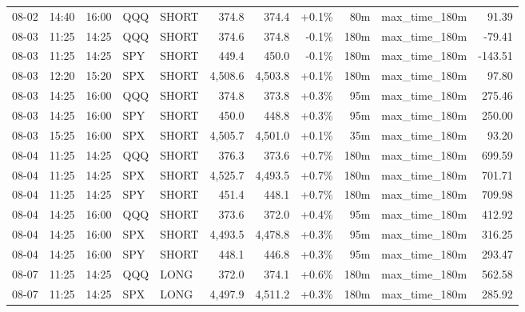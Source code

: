 \documentclass[11pt,a4paper,twoside]{article}
\begin{document}
\begin{center}
\begin{longtable}{>{\color{txtmain}}l l l l l r r r r >{\color{txtmain}}l r}
08-02 & 14:40 & 16:00 & QQQ & SHORT & 374.8 & 374.4 & \textcolor{wingreen}{+0.1\%} & 80m & max\_time\_180m & \textcolor{wingreen}{91.39} \\
08-03 & 11:25 & 14:25 & QQQ & SHORT & 374.6 & 374.8 & \textcolor{lossred}{-0.1\%} & 180m & max\_time\_180m & \textcolor{lossred}{-79.41} \\
08-03 & 11:25 & 14:25 & SPY & SHORT & 449.4 & 450.0 & \textcolor{lossred}{-0.1\%} & 180m & max\_time\_180m & \textcolor{lossred}{-143.51} \\
08-03 & 12:20 & 15:20 & SPX & SHORT & 4,508.6 & 4,503.8 & \textcolor{wingreen}{+0.1\%} & 180m & max\_time\_180m & \textcolor{wingreen}{97.80} \\
08-03 & 14:25 & 16:00 & QQQ & SHORT & 374.8 & 373.8 & \textcolor{wingreen}{+0.3\%} & 95m & max\_time\_180m & \textcolor{wingreen}{275.46} \\
08-03 & 14:25 & 16:00 & SPY & SHORT & 450.0 & 448.8 & \textcolor{wingreen}{+0.3\%} & 95m & max\_time\_180m & \textcolor{wingreen}{250.00} \\
08-03 & 15:25 & 16:00 & SPX & SHORT & 4,505.7 & 4,501.0 & \textcolor{wingreen}{+0.1\%} & 35m & max\_time\_180m & \textcolor{wingreen}{93.20} \\
08-04 & 11:25 & 14:25 & QQQ & SHORT & 376.3 & 373.6 & \textcolor{wingreen}{+0.7\%} & 180m & max\_time\_180m & \textcolor{wingreen}{699.59} \\
08-04 & 11:25 & 14:25 & SPX & SHORT & 4,525.7 & 4,493.5 & \textcolor{wingreen}{+0.7\%} & 180m & max\_time\_180m & \textcolor{wingreen}{701.71} \\
08-04 & 11:25 & 14:25 & SPY & SHORT & 451.4 & 448.1 & \textcolor{wingreen}{+0.7\%} & 180m & max\_time\_180m & \textcolor{wingreen}{709.98} \\
08-04 & 14:25 & 16:00 & QQQ & SHORT & 373.6 & 372.0 & \textcolor{wingreen}{+0.4\%} & 95m & max\_time\_180m & \textcolor{wingreen}{412.92} \\
08-04 & 14:25 & 16:00 & SPX & SHORT & 4,493.5 & 4,478.8 & \textcolor{wingreen}{+0.3\%} & 95m & max\_time\_180m & \textcolor{wingreen}{316.25} \\
08-04 & 14:25 & 16:00 & SPY & SHORT & 448.1 & 446.8 & \textcolor{wingreen}{+0.3\%} & 95m & max\_time\_180m & \textcolor{wingreen}{293.47} \\
08-07 & 11:25 & 14:25 & QQQ & LONG & 372.0 & 374.1 & \textcolor{wingreen}{+0.6\%} & 180m & max\_time\_180m & \textcolor{wingreen}{562.58} \\
08-07 & 11:25 & 14:25 & SPX & LONG & 4,497.9 & 4,511.2 & \textcolor{wingreen}{+0.3\%} & 180m & max\_time\_180m & \textcolor{wingreen}{285.92} \\

\end{longtable}
\end{center}
\end{document}
